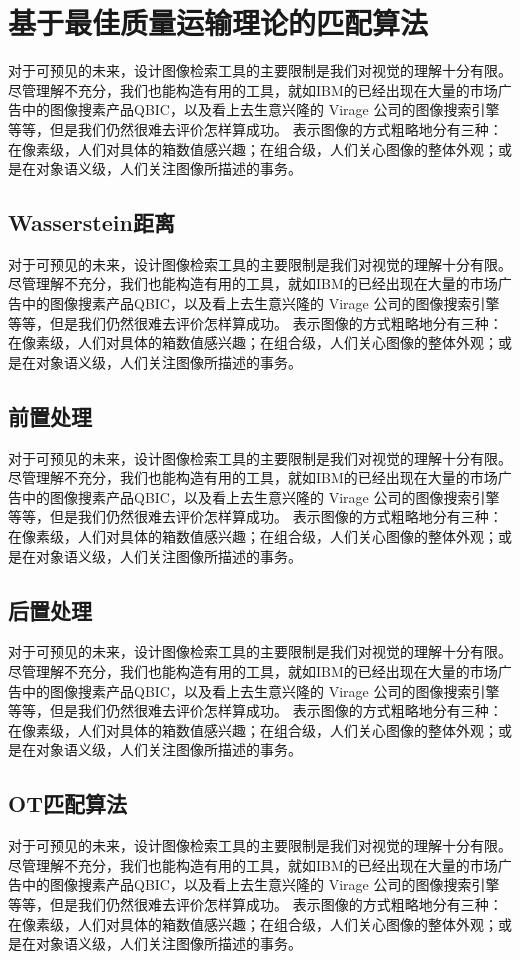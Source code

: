 \section{基于最佳质量运输理论的匹配算法}

对于可预见的未来，设计图像检索工具的主要限制是我们对视觉的理解十分有限。尽管理解不充分，我们也能构造有用的工具，就如IBM的已经出现在大量的市场广告中的图像搜素产品QBIC，以及看上去生意兴隆的
Virage 公司的图像搜索引擎等等，但是我们仍然很难去评价怎样算成功。
表示图像的方式粗略地分有三种：在像素级，人们对具体的箱数值感兴趣；在组合级，人们关心图像的整体外观；或是在对象语义级，人们关注图像所描述的事务。

\subsection{Wasserstein距离}

对于可预见的未来，设计图像检索工具的主要限制是我们对视觉的理解十分有限。尽管理解不充分，我们也能构造有用的工具，就如IBM的已经出现在大量的市场广告中的图像搜素产品QBIC，以及看上去生意兴隆的
Virage 公司的图像搜索引擎等等，但是我们仍然很难去评价怎样算成功。
表示图像的方式粗略地分有三种：在像素级，人们对具体的箱数值感兴趣；在组合级，人们关心图像的整体外观；或是在对象语义级，人们关注图像所描述的事务。

\subsection{前置处理}

对于可预见的未来，设计图像检索工具的主要限制是我们对视觉的理解十分有限。尽管理解不充分，我们也能构造有用的工具，就如IBM的已经出现在大量的市场广告中的图像搜素产品QBIC，以及看上去生意兴隆的
Virage 公司的图像搜索引擎等等，但是我们仍然很难去评价怎样算成功。
表示图像的方式粗略地分有三种：在像素级，人们对具体的箱数值感兴趣；在组合级，人们关心图像的整体外观；或是在对象语义级，人们关注图像所描述的事务。

\subsection{后置处理}

对于可预见的未来，设计图像检索工具的主要限制是我们对视觉的理解十分有限。尽管理解不充分，我们也能构造有用的工具，就如IBM的已经出现在大量的市场广告中的图像搜素产品QBIC，以及看上去生意兴隆的
Virage 公司的图像搜索引擎等等，但是我们仍然很难去评价怎样算成功。
表示图像的方式粗略地分有三种：在像素级，人们对具体的箱数值感兴趣；在组合级，人们关心图像的整体外观；或是在对象语义级，人们关注图像所描述的事务。

\subsection{OT匹配算法}

对于可预见的未来，设计图像检索工具的主要限制是我们对视觉的理解十分有限。尽管理解不充分，我们也能构造有用的工具，就如IBM的已经出现在大量的市场广告中的图像搜素产品QBIC，以及看上去生意兴隆的
Virage 公司的图像搜索引擎等等，但是我们仍然很难去评价怎样算成功。
表示图像的方式粗略地分有三种：在像素级，人们对具体的箱数值感兴趣；在组合级，人们关心图像的整体外观；或是在对象语义级，人们关注图像所描述的事务。


